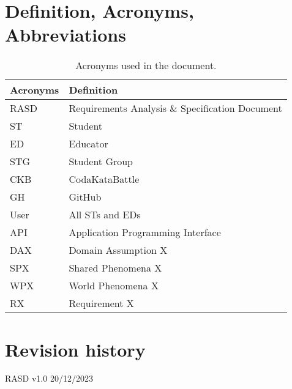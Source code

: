 \section{Definition, Acronyms, Abbreviations}
\label{sec:definition_acronyms_abbreviations}%
\begin{table}[H]
    \begin{center}
        \begin{tabular}{ |l|l| }
            \hline
            \textbf{Acronyms} & \textbf{Definition}                              \\
            \hline
            RASD             & Requirements Analysis \& Specification Document                      \\
            \hline
            ST              & Student                         \\
            \hline
            ED              & Educator                         \\
            \hline
            STG             & Student Group                    \\
            \hline
            CKB             & CodaKataBattle                   \\
            \hline
            GH              & GitHub                           \\
            \hline
            User            & All STs and EDs                           \\
            \hline
            API             & Application Programming Interface                           \\
            \hline
            DAX             & Domain Assumption X                           \\
            \hline
            SPX             & Shared Phenomena X                           \\
            \hline
            WPX             & World Phenomena X                           \\
            \hline
            RX              & Requirement X                           \\
            \hline
         \end{tabular}
        \caption{Acronyms used in the document.}
        \label{tab:acronyms}%
    \end{center}
\end{table}




\section{Revision history}
\label{sec:revision_history}%
RASD v1.0 20/12/2023

